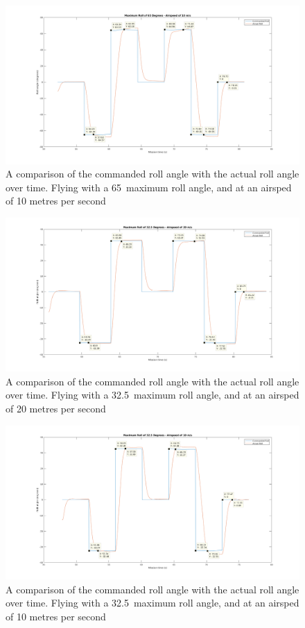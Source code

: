 \begin{figure} 
\centering    
\includegraphics[scale=0.5]{65_10_cursors}
\caption{A comparison of the commanded roll angle with the actual roll angle over time. Flying with a 65\degree\  maximum roll angle, and at an airsped of 10 metres per second}
\end{figure}

\begin{figure} 
\centering    
\includegraphics[scale=0.5]{32_20_cursors}
\caption{A comparison of the commanded roll angle with the actual roll angle over time. Flying with a 32.5\degree\  maximum roll angle, and at an airsped of 20 metres per second}
\end{figure}

\begin{figure} 
\centering    
\includegraphics[scale=0.5]{32_10_cursors}
\caption{A comparison of the commanded roll angle with the actual roll angle over time. Flying with a 32.5\degree\  maximum roll angle, and at an airsped of 10 metres per second}
\end{figure}